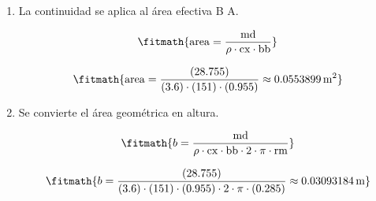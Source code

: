 \begin{enumerate}

\item La continuidad se aplica al área efectiva B A.

\[\fitmath{\mathrm{area}=\frac{\mathrm{md}}{\rho\cdot \mathrm{cx}\cdot \mathrm{bb}}}\]

\[\fitmath{\mathrm{area}=\frac{(28.755)}{(3.6)\cdot (151)\cdot (0.955)}\approx 0.0553899\,\mathrm{m^{2}}}\]

\item Se convierte el área geométrica en altura.

\[\fitmath{b=\frac{\mathrm{md}}{\rho\cdot \mathrm{cx}\cdot \mathrm{bb}\cdot 2\cdot \pi\cdot \mathrm{rm}}}\]

\[\fitmath{b=\frac{(28.755)}{(3.6)\cdot (151)\cdot (0.955)\cdot 2\cdot \pi\cdot (0.285)}\approx 0.03093184\,\mathrm{m}}\]

\end{enumerate}
